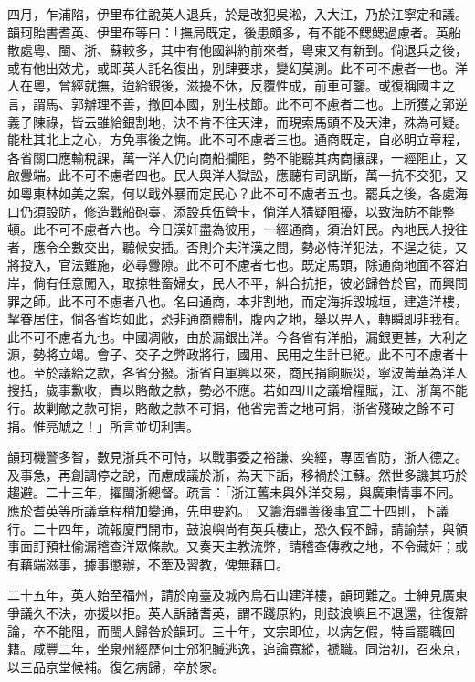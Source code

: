 \begin{pinyinscope}
四月，乍浦陷，伊里布往說英人退兵，於是改犯吳淞，入大江，乃於江寧定和議。韻珂貽書耆英、伊里布等曰：「撫局既定，後患頗多，有不能不鰓鰓過慮者。英船散處粵、閩、浙、蘇較多，其中有他國糾約前來者，粵東又有新到。倘退兵之後，或有他出效尤，或即英人託名復出，別肆要求，變幻莫測。此不可不慮者一也。洋人在粵，曾經就撫，迨給銀後，滋擾不休，反覆性成，前車可鑒。或復稱國主之言，謂馬、郭辦理不善，撤回本國，別生枝節。此不可不慮者二也。上所獲之郭逆義子陳祿，皆云雖給銀割地，決不肯不往天津，而現索馬頭不及天津，殊為可疑。能杜其北上之心，方免事後之悔。此不可不慮者三也。通商既定，自必明立章程，各省關口應輸稅課，萬一洋人仍向商船攔阻，勢不能聽其病商攘課，一經阻止，又啟釁端。此不可不慮者四也。民人與洋人獄訟，應聽有司訊斷，萬一抗不交犯，又如粵東林如美之案，何以戢外暴而定民心？此不可不慮者五也。罷兵之後，各處海口仍須設防，修造戰船砲臺，添設兵伍營卡，倘洋人猜疑阻擾，以致海防不能整頓。此不可不慮者六也。今日漢奸盡為彼用，一經通商，須治奸民。內地民人投往者，應令全數交出，聽候安插。否則介夫洋漢之間，勢必恃洋犯法，不逞之徒，又將投入，官法難施，必尋釁隙。此不可不慮者七也。既定馬頭，除通商地面不容泊岸，倘有任意闖入，取掠牲畜婦女，民人不平，糾合抗拒，彼必歸咎於官，而興問罪之師。此不可不慮者八也。名曰通商，本非割地，而定海拆毀城垣，建造洋樓，挈眷居住，倘各省均如此，恐非通商體制，腹內之地，舉以畀人，轉瞬即非我有。此不可不慮者九也。中國凋敝，由於漏銀出洋。今各省有洋船，漏銀更甚，大利之源，勢將立竭。會子、交子之弊政將行，國用、民用之生計已絕。此不可不慮者十也。至於議給之款，各省分撥。浙省自軍興以來，商民捐餉賑災，寧波菁華為洋人搜括，歲事歉收，責以賂敵之款，勢必不應。若如四川之議增糧賦，江、浙萬不能行。故剿敵之款可捐，賂敵之款不可捐，他省完善之地可捐，浙省殘破之餘不可捐。惟亮虓之！」所言並切利害。

韻珂機警多智，數見浙兵不可恃，以戰事委之裕謙、奕經，專固省防，浙人德之。及事急，再創調停之說，而慮成議於浙，為天下詬，移禍於江蘇。然世多譏其巧於趨避。二十三年，擢閩浙總督。疏言：「浙江舊未與外洋交易，與廣東情事不同。應於耆英等所議章程稍加變通，先申要約。」又籌海疆善後事宜二十四則，下議行。二十四年，疏報廈門開市，鼓浪嶼尚有英兵棲止，恐久假不歸，請諭禁，與領事面訂預杜偷漏稽查洋眾條款。又奏天主教流弊，請稽查傳教之地，不令藏奸；或有藉端滋事，據事懲辦，不牽及習教，俾無藉口。

二十五年，英人始至福州，請於南臺及城內烏石山建洋樓，韻珂難之。士紳見廣東爭議久不決，亦援以拒。英人訴諸耆英，謂不踐原約，則鼓浪嶼且不退還，往復辯論，卒不能阻，而閩人歸咎於韻珂。三十年，文宗即位，以病乞假，特旨罷職回籍。咸豐二年，坐泉州經歷何士邠犯贓逃逸，追論寬縱，褫職。同治初，召來京，以三品京堂候補。復乞病歸，卒於家。


\end{pinyinscope}
